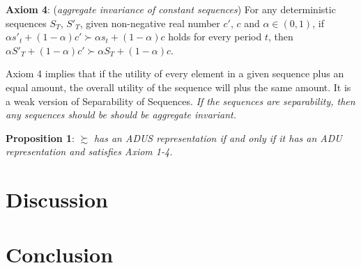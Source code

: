 \documentclass[
  12pt,
]{article}
\begin{document}
\textbf{Axiom 4}: (\emph{aggregate invariance of constant sequences})
For any deterministic sequences \(S_T\), \(S'_T\), given non-negative
real number \(c'\), \(c\) and \(\alpha\in(0,1)\), if
\(\alpha s'_t+(1-\alpha)c'\succ\alpha s_t+(1-\alpha)c\) holds for every
period \(t\), then
\(\alpha S'_T+(1-\alpha)c'\succ \alpha S_T+(1-\alpha)c\).

Axiom 4 implies that if the utility of every element in a given sequence
plus an equal amount, the overall utility of the sequence will plus the
same amount. It is a weak version of Separability of Sequences. \emph{If
the sequences are separability, then any sequences should be should be
aggregate invariant.}

\textbf{Proposition 1}: \(\succsim\) \emph{has an ADUS representation if
and only if it has an ADU representation and satisfies Axiom 1-4.}

\hypertarget{discussion}{%
\section{Discussion}\label{discussion}}

\hypertarget{conclusion}{%
\section{Conclusion}\label{conclusion}}

\renewcommand\refname{Reference}
  
\end{document}
